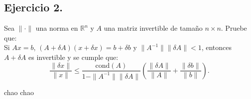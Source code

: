
\subsection*{Ejercicio 2.}
Sea $\| \cdot \|$ una norma en $\mathbb{R}^n$ y $A$ una matriz invertible de tamaño $n \times n$. Pruebe que:\\

Si $Ax = b$, $(A + \delta A)(x + \delta x) = b + \delta b$ y $\|A^{-1}\| \|\delta A\| < 1$, entonces $A + \delta A$ es invertible y se cumple que:
\[
\frac{\|\delta x\|}{\|x\|} \leq \frac{\text{cond}(A)}{1 - \|A^{-1}\| \|\delta A\|} \left( \frac{\|\delta A\|}{\|A\|} + \frac{\|\delta b\|}{\|b\|} \right).
\]

\begin{sproof}
    chao chao
\end{sproof}